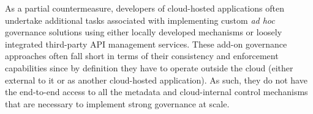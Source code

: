 As a partial countermeasure, developers of cloud-hosted applications often 
undertake additional tasks associated with 
implementing custom {\em ad hoc} governance solutions using either locally
developed mechanisms or loosely integrated
third-party API management services. 
These add-on governance
approaches often fall short in terms of their consistency and enforcement
capabilities since
by definition they have to operate outside the
cloud (either external to it or as another cloud-hosted application). 
As such, they do not have the end-to-end 
access to all the metadata and cloud-internal control mechanisms
that are necessary to implement strong governance at scale. 
